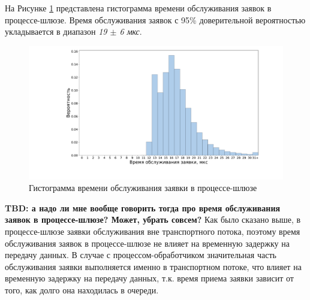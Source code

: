 На Рисунке \ref{chapter41:TRLatency} представлена гистограмма времени обслуживания заявок в процессе-шлюзе. Время обслуживания заявок с 95\% доверительной вероятностью укладывается в диапазон \textit{19 $\pm$ 6 мкс}.
\begin{figure}[!h]
\caption{Гистограмма времени обслуживания заявки в процессе-шлюзе}
\label{chapter41:TRLatency}
\includegraphics[width=\textwidth]{../../graphics/hist/TR}
\end{figure}

\textbf{TBD: а надо ли мне вообще говорить тогда про время обслуживания заявок в процессе-шлюзе? Может, убрать совсем?}
Как было сказано выше, в процессе-шлюзе заявки обслуживания вне транспортного потока, поэтому время обслуживания заявок в процессе-шлюзе не влияет на временную задержку на передачу данных. В случае с процессом-обработчиком значительная часть обслуживания заявки выполняется именно в транспортном потоке, что влияет на временную задержку на передачу данных, т.к. время приема заявки зависит от того, как долго она находилась в очереди.
